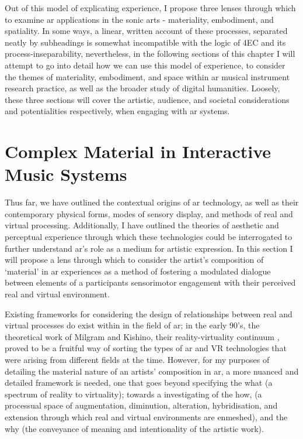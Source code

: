 Out of this model of explicating experience, I propose three lenses through which to examine \gls{ar} applications in the sonic arts - materiality, embodiment, and spatiality. In some ways, a linear, written account of these processes, separated neatly by subheadings is somewhat incompatible with the logic of 4EC and its process-inseparability, nevertheless, in the following sections of this chapter I will attempt to go into detail how we can use this model of experience, to consider the themes of materiality, embodiment, and space within \gls{ar} musical instrument research practice, as well as the broader study of digital humanities. Loosely, these three sections will cover the artistic, audience, and societal considerations and potentialities respectively, when engaging with \gls{ar} systems.



\section{Complex Material in Interactive Music Systems}\label{sec: theory-materiality}
Thus far, we have outlined the contextual origins of \gls{ar} technology, as well as their contemporary physical forms, modes of sensory display, and methods of real and virtual processing. Additionally, I have outlined the theories of aesthetic and perceptual experience through which these technologies could be interrogated to further understand \gls{ar}'s role as a medium for artistic expression. In this section I will propose a lens through which to consider the artist's composition of `material' in \gls{ar} experiences as a method of fostering a modulated dialogue between elements of a participants sensorimotor engagement with their perceived real and virtual environment. 

Existing frameworks for considering the design of relationships between real and virtual processes do exist within in the field of \gls{ar}; in the early 90's, the theoretical work of Milgram and Kishino, their reality-virtuality continuum \citeyearpar[p. 10]{milgram1994}, proved to be a fruitful way of sorting the types of \gls{ar} and VR technologies that were arising from different fields at the time. However, for my purposes of detailing the material nature of an artists' composition in \gls{ar}, a more nuanced and detailed framework is needed, one that goes beyond specifying the what (a spectrum of reality to virtuality); towards a investigating of the how, (a processual space of augmentation, diminution, alteration, hybridisation, and extension through which real and virtual environments are enmeshed), and the why (the conveyance of meaning and intentionality of the artistic work). 

